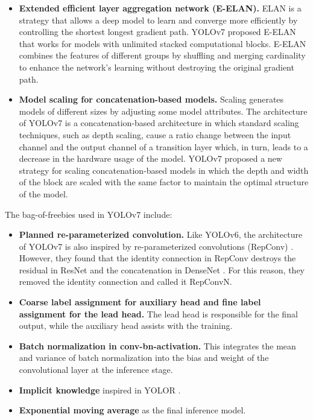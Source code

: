 \documentclass{article}
\begin{document}
\begin{itemize}
    \item \textbf{Extended efficient layer aggregation network (E-ELAN).} ELAN \cite{wang2022designing} is a strategy that allows a deep model to learn and converge more efficiently by controlling the shortest longest gradient path. YOLOv7 proposed E-ELAN that works for models with unlimited stacked computational blocks. E-ELAN combines the features of different groups by shuffling and merging cardinality to enhance the network’s learning without destroying the original gradient path.
    \item \textbf{Model scaling for concatenation-based models.} Scaling generates models of different sizes by adjusting some model attributes. The architecture of YOLOv7 is a concatenation-based architecture in which standard scaling techniques, such as depth scaling, cause a ratio change between the input channel and the output channel of a transition layer which, in turn, leads to a decrease in the hardware usage of the model. YOLOv7 proposed a new strategy for scaling concatenation-based models in which the depth and width of the block are scaled with the same factor to maintain the optimal structure of the model.
\end{itemize}


The bag-of-freebies used in YOLOv7 include:

\begin{itemize}
    \item \textbf{Planned re-parameterized convolution.} Like YOLOv6, the architecture of YOLOv7 is also inspired by re-parameterized convolutions (RepConv) \cite{ding2021repvgg}. However, they found that the identity connection in RepConv destroys the residual in ResNet \cite{he2016deep} and the concatenation in DenseNet \cite{huang2017densely}. For this reason, they removed the identity connection and called it RepConvN.
    \item \textbf{Coarse label assignment for auxiliary head and fine label assignment for the lead head.} The lead head is responsible for the final output, while the auxiliary head assists with the training.
    \item \textbf{Batch normalization in conv-bn-activation.} This integrates the mean and variance of batch normalization into the bias and weight of the convolutional layer at the inference stage.
    \item \textbf{Implicit knowledge} inspired in YOLOR \cite{wang2021you}.
    \item \textbf{Exponential moving average} as the final inference model.
\end{itemize}
\end{document}
